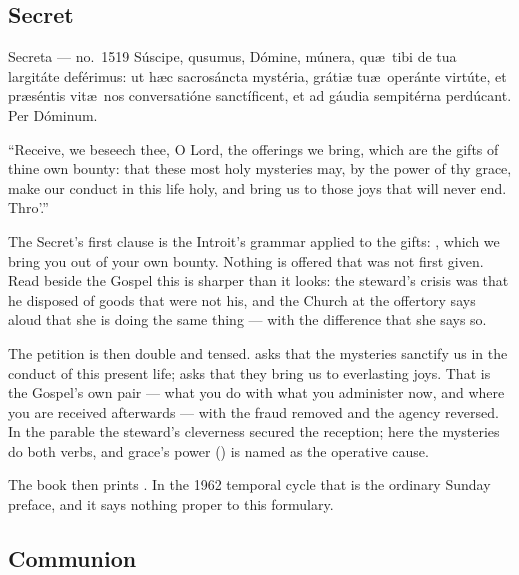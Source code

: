 \subsection{Secret }

\begin{appointed}{Secreta --- no.\ 1519}
Súscipe, qu\aeacute sumus, Dómine, múnera, qu\ae\ tibi de tua largitáte
deférimus: ut h\ae c sacrosáncta mystéria, grátiæ tu\ae\ operánte virtúte, et
pr\ae séntis vit\ae\ nos conversatióne sanctíficent, et ad gáudia sempitérna
perdúcant. Per Dóminum.
\end{appointed}

\begin{englishwitness}
``Receive, we beseech thee, O Lord, the offerings we bring, which are the gifts
of thine own bounty: that these most holy mysteries may, by the power of thy
grace, make our conduct in this life holy, and bring us to those joys that will
never end. Thro'.''
\end{englishwitness}

The Secret's first clause is the Introit's grammar applied to the gifts:
, which we bring you out of your
own bounty. Nothing is offered that was not first given. Read beside the Gospel
this is sharper than it looks: the steward's crisis was that he disposed of
goods that were not his, and the Church at the offertory says aloud that she is
doing the same thing --- with the difference that she says so.

The petition is then double and tensed.  asks that the mysteries sanctify us in the conduct
of this present life;  asks that they
bring us to everlasting joys. That is the Gospel's own pair --- what you do with
what you administer now, and where you are received afterwards --- with the
fraud removed and the agency reversed. In the parable the steward's cleverness
secured the reception; here the mysteries do both verbs, and grace's power
() is named as the operative cause.

The book then prints . In the 1962 temporal
cycle that is the ordinary Sunday preface, and it says nothing proper to this
formulary.

\subsection{Communion }

